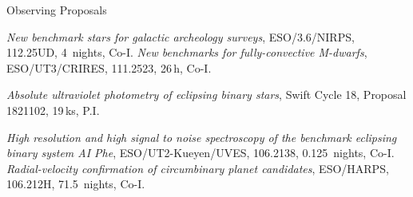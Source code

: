 \begin{rubric}{Observing Proposals}

\entry*[2023]
    \textit{New benchmark stars for galactic archeology surveys}, ESO/3.6/NIRPS, 112.25UD, 4~nights, Co-I.
\entry*[2023]
    \textit{New benchmarks for fully-convective M-dwarfs}, ESO/UT3/CRIRES, 111.2523, 26\,h, Co-I.

\entry*[2022]
    \textit{Absolute ultraviolet photometry of eclipsing binary stars}, Swift Cycle 18, Proposal 1821102, 19\,ks, P.I.

\entry*[2020]
    \textit{High resolution and high signal to noise spectroscopy of the benchmark eclipsing binary system AI Phe}, ESO/UT2-Kueyen/UVES, 106.2138, 0.125~nights, Co-I.
\entry*[2020]
    \textit{Radial-velocity confirmation of circumbinary planet candidates}, ESO/HARPS, 106.212H, 71.5~nights, Co-I.



\end{rubric}